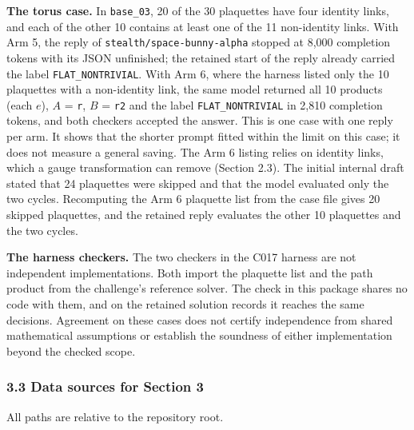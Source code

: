 \documentclass[
  11pt,
]{article}
\begin{document}
\textbf{The torus case.} In \texttt{base\_\allowbreak{}03}, 20 of the 30
plaquettes have four identity links, and each of the other 10 contains
at least one of the 11 non-identity links. With Arm 5, the reply of
\texttt{stealth/\allowbreak{}space-\allowbreak{}bunny-\allowbreak{}alpha}
stopped at 8,000 completion tokens with its JSON unfinished; the
retained start of the reply already carried the label
\texttt{FLAT\_\allowbreak{}NONTRIVIAL}. With Arm 6, where the harness
listed only the 10 plaquettes with a non-identity link, the same model
returned all 10 products (each \(e\)), \(A\) = \texttt{r}, \(B\) =
\texttt{r2} and the label \texttt{FLAT\_\allowbreak{}NONTRIVIAL} in
2,810 completion tokens, and both checkers accepted the answer. This is
one case with one reply per arm. It shows that the shorter prompt fitted
within the limit on this case; it does not measure a general saving. The
Arm 6 listing relies on identity links, which a gauge transformation can
remove (Section 2.3). The initial internal draft stated that 24
plaquettes were skipped and that the model evaluated only the two
cycles. Recomputing the Arm 6 plaquette list from the case file gives 20
skipped plaquettes, and the retained reply evaluates the other 10
plaquettes and the two cycles.

\textbf{The harness checkers.} The two checkers in the C017 harness are
not independent implementations. Both import the plaquette list and the
path product from the challenge's reference solver. The check in this
package shares no code with them, and on the retained solution records
it reaches the same decisions. Agreement on these cases does not certify
independence from shared mathematical assumptions or establish the
soundness of either implementation beyond the checked scope.

\hypertarget{data-sources-for-section-3}{%
\subsubsection{3.3 Data sources for Section
3}\label{data-sources-for-section-3}}

All paths are relative to the repository root.
\end{document}

